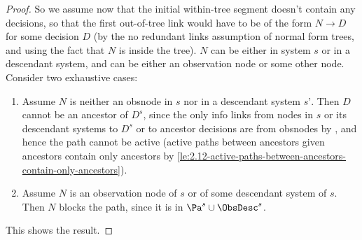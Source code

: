 \begin{proof}
So we assume now that the initial within-tree segment doesn't contain any decisions, so that the first out-of-tree link would have to be of the form $N \to D$ for some decision $D$ (by the no redundant links assumption of normal form trees, and using the fact that $N$ is inside the tree). $N$ can be either in system $s$ or in a descendant system, and can be either an observation node or some other node. Consider two exhaustive cases:

\begin{enumerate}[label=(\alph*)]
    \item Assume $N$ is neither an obsnode in $s$ nor in a descendant system $s’$. Then $D$ cannot be an ancestor of $D^s$, since the only info links from nodes in $s$ or its descendant systems to $D^s$ or to ancestor decisions are from obsnodes by , and hence the path cannot be active (active paths between ancestors given ancestors contain only ancestors by \cref{le:2.12-active-paths-between-ancestors-contain-only-ancestors}).
    
    \item Assume $N$ is an observation node of $s$  or of some descendant system of $s$. Then $N$ blocks the path, since it is in $\Pa^s\cup \ObsDesc^s$.
    
\end{enumerate}
This shows the result.
\end{proof}



